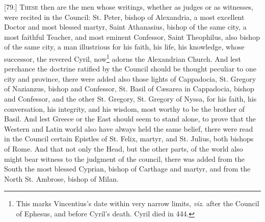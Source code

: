 [79.] \textsc{These} then are the men whose writings, whether as judges or as witnesses, were recited in the Council: St. Peter, bishop of Alexandria, a most excellent Doctor and most blessed martyr, Saint Athanasius, bishop of the same city, a most faithful Teacher, and most eminent Confessor, Saint Theophilus, also bishop of the same city, a man illustrious for his faith, his life, his knowledge, whose successor, the revered Cyril, now\footnote{This marks Vincentius’s date within very narrow limits, \emph{viz}. after the Council of Ephesus, and before Cyril’s death. Cyril died in 444.} adorns the Alexandrian Church. And lest perchance the doctrine ratified by the Council should be thought peculiar to one city and province, there were added also those lights of Cappadocia, St. Gregory of Nazianzus, bishop and Confessor, St. Basil of Cæsarea in Cappadocia, bishop and Confessor, and the other St. Gregory, St. Gregory of Nyssa, for his faith, his conversation, his integrity, and his wisdom, most worthy to be the brother of Basil. And lest Greece or the East should seem to stand alone, to prove that the Western and Latin world also have always held the same belief, there were read in the Council certain Epistles of St. Felix, martyr, and St. Julius, both bishops of Rome. And that not only the Head, but the other parts, of the world also might bear witness to the judgment of the council, there was added from the South the most blessed Cyprian, bishop of Carthage and martyr, and from the North St. Ambrose, bishop of Milan.

